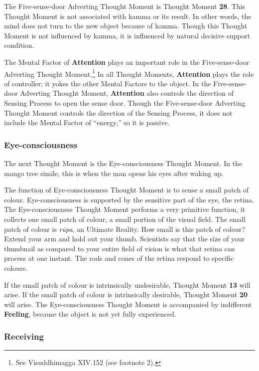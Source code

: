 The Five-sense-door Adverting Thought Moment is Thought Moment \textbf{28}. This Thought Moment is not associated with kamma or its result. In other words, the mind does not turn to the new object because of kamma. Though this Thought Moment is not influenced by kamma, it is influenced by natural decisive support condition.

The Mental Factor of \textbf{Attention} plays an important role in the Five-sense-door Adverting Thought Moment.\footnote{See Visuddhimagga XIV.152 (see footnote 2).} In all Thought Moments, \textbf{Attention} plays the role of controller; it yokes the other Mental Factors to the object. In the Five-sense-door Adverting Thought Moment, \textbf{Attention} also controls the direction of Sensing Process to open the sense door. Though the Five-sense-door Adverting Thought Moment controls the direction of the Sensing Process, it does not include the Mental Factor of “energy,” so it is passive.

\subsubsection*{Eye-consciousness}

The next Thought Moment is the Eye-consciousness Thought Moment. In the mango tree simile, this is when the man opens his eyes after waking up.

The function of Eye-consciousness Thought Moment is to sense a small patch of colour. Eye-consciousness is supported by the sensitive part of the eye, the retina. The Eye-consciousness Thought Moment performs a very primitive function, it collects one small patch of colour, a small portion of the visual field. The small patch of colour is \textit{rūpa}, an Ultimate Reality. How small is this patch of colour? Extend your arm and hold out your thumb. Scientists say that the size of your thumbnail as compared to your entire field of vision is what that retina can process at one instant. The rods and cones of the retina respond to specific colours.

If the small patch of colour is intrinsically undesirable, Thought Moment \textbf{13} will arise. If the small patch of colour is intrinsically desirable, Thought Moment \textbf{20} will arise. The Eye-consciousness Thought Moment is accompanied by indifferent \textbf{Feeling}, because the object is not yet fully experienced.

\subsubsection*{Receiving}

